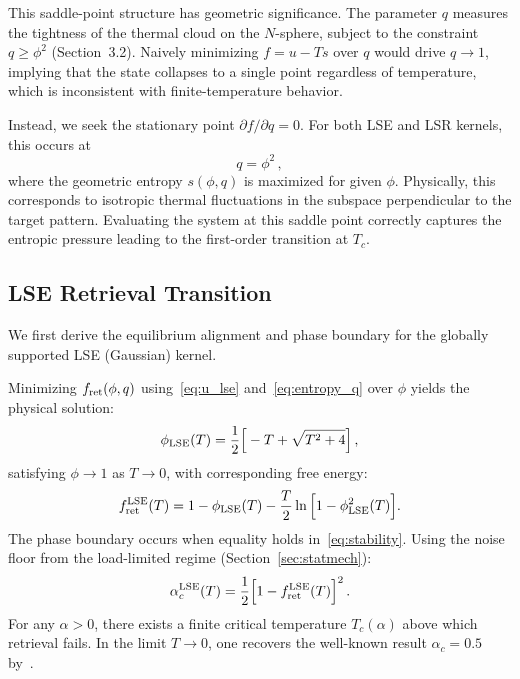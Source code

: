 \documentclass{article}
\theoremstyle{plain}
\theoremstyle{definition}
\theoremstyle{remark}
\begin{document}
This saddle-point structure has geometric significance. The parameter $q$ measures the tightness of the thermal cloud on the $N$-sphere, subject to the constraint $q \ge \phi^2$ (Section~3.2). Naively minimizing $f = u - Ts$ over $q$ would drive $q \to 1$, implying that the state collapses to a single point regardless of temperature, which is inconsistent with finite-temperature behavior.

Instead, we seek the stationary point $\partial f / \partial q = 0$. For both LSE and LSR kernels, this occurs at 
\begin{equation}
    q = \phi^2\,,
    \label{eq:q_constraint}
\end{equation}
where the geometric entropy $s(\phi, q)$ is maximized for given $\phi$. Physically, this corresponds to isotropic thermal fluctuations in the subspace perpendicular to the target pattern. Evaluating the system at this saddle point correctly captures the entropic pressure leading to the first-order transition at $T_c$.

\subsection{LSE Retrieval Transition}
We first derive the equilibrium alignment and phase boundary for the globally supported LSE (Gaussian) kernel.

Minimizing $f_{\rm ret}(\phi, q)$ using~\eqref{eq:u_lse} and~\eqref{eq:entropy_q} over $\phi$ yields the physical solution:
\begin{equation}
    \phi_{\rm LSE}(T) = \frac{1}{2} \Big[-T + \sqrt{T^2 + 4}\Big]\,,
    \label{eq:phi_lse}
\end{equation}
satisfying $\phi \to 1$ as $T \to 0$, with corresponding free energy:
\begin{equation}
    f_{\rm ret}^{\rm LSE}(T) = 1 - \phi_{\rm LSE}(T) - \frac{T}{2}\ln\Big[1 - \phi^2_{\rm LSE}(T)\Big].
    \label{eq:f_lse}
\end{equation}
The phase boundary occurs when equality holds in~\eqref{eq:stability}. Using the noise floor from the load-limited regime (Section~\ref{sec:statmech}):
\begin{equation}
    \alpha_c^{\rm LSE}(T) = \frac{1}{2} \Big[1 - f_{\rm ret}^{\rm LSE}(T) \Big]^2\,.
    \label{eq:alpha_lse}
\end{equation}
For any $\alpha > 0$, there exists a finite critical temperature $T_c(\alpha)$ above which retrieval fails. In the limit $T \to 0$, one recovers the well-known result $\alpha_c = 0.5$ by~\citet{ramsauer2021hopfield}.
\end{document}
